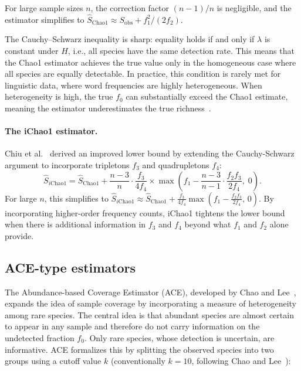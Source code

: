 ﻿\documentclass{article}
\begin{document}
For large sample sizes $n$, the correction factor $(n-1)/n$ is negligible, and the estimator simplifies to
$\hat{S}_{\mathrm{Chao1}} \approx S_{\mathrm{obs}} + f_1^2/(2f_2)$.

The Cauchy--Schwarz inequality is sharp: equality holds if and only if $\lambda$ is constant under $H$, i.e., all species have the same detection rate. This means that the Chao1 estimator achieves the true value only in the homogeneous case where all species are equally detectable. In practice, this condition is rarely met for linguistic data, where word frequencies are highly heterogeneous. When heterogeneity is high, the true $f_0$ can substantially exceed the Chao1 estimate, meaning the estimator underestimates the true richness~\cite{chao2016species,schmitz2025}.


\paragraph{The iChao1 estimator.}
Chiu et al.~\cite{chiu2014} derived an improved lower bound by extending the Cauchy-Schwarz argument to incorporate tripletons $f_3$ and quadrupletons $f_4$:
\begin{equation}\label{eq:ichao1}
    \hat{S}_{i\mathrm{Chao1}} =
    \hat{S}_{\mathrm{Chao1}} +
    \frac{n-3}{n} \cdot \frac{f_3}{4 f_4}
    \times
    \max\!\left(
        f_1 - \frac{n-3}{n-1} \cdot \frac{f_2 f_3}{2 f_4},\; 0
    \right).
\end{equation}
For large $n$, this simplifies to
$\hat{S}_{i\mathrm{Chao1}} \approx \hat{S}_{\mathrm{Chao1}} 
+ \frac{f_3}{4 f_4} \max\!\left(f_1 - \frac{f_2 f_3}{2 f_4},\, 0\right)$.
By incorporating higher-order frequency counts, iChao1 tightens the lower bound when there is additional information in $f_3$ and $f_4$ beyond what $f_1$ and $f_2$ alone provide.


\subsection{ACE-type estimators}

The Abundance-based Coverage Estimator (ACE), developed by Chao and Lee~\cite{chaolee1992}, expands the idea of sample coverage by incorporating a measure of heterogeneity among rare species. The central idea is that abundant species are almost certain to appear in any sample and therefore do not carry information on the undetected fraction $f_0$. Only rare species, whose detection is uncertain, are informative. ACE formalizes this by splitting the observed species into two groups using a cutoff value $k$ (conventionally $k = 10$, following Chao and Lee~\cite{chaolee1992}):
\end{document}
